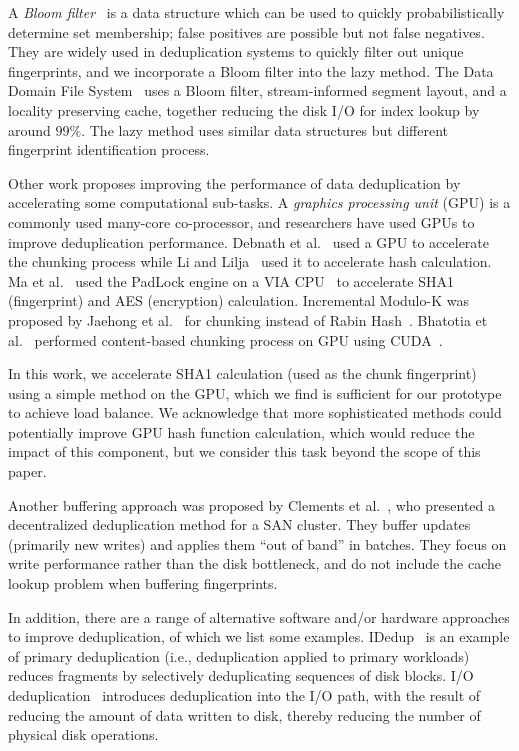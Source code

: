 \documentclass[prodmode,acmtecs]{acmsmall}
\begin{document}
A \emph{Bloom filter}~\cite{bloom1970space,bose2008false} is a data structure which can be used to quickly probabilistically determine set membership; false positives are possible but not false negatives.  They are widely used in deduplication systems to quickly filter out unique fingerprints, and we incorporate a Bloom filter into the lazy method.  The Data Domain File System~\cite{zhu2008avoiding} uses a Bloom filter, stream-informed segment layout, and a locality preserving cache, together reducing the disk I/O for index lookup by around $99\%$. The lazy method uses similar data structures but different fingerprint identification process.

Other work proposes improving the performance of data deduplication by accelerating some computational sub-tasks. A \emph{graphics processing unit} (GPU) is a commonly used many-core co-processor, and researchers have used GPUs to improve deduplication performance. Debnath et al.~\cite{bhatotia2012shredder} used a GPU to accelerate the chunking process while Li and Lilja~\cite{li2009highly} used it to accelerate hash calculation.  Ma et al.~\cite{ma2010towards} used the PadLock engine on a VIA CPU~\cite{via} to accelerate SHA1 (fingerprint) and AES (encryption) calculation.  Incremental Modulo-K was proposed by Jaehong et al.~\cite{min2011efficient} for chunking instead of Rabin Hash~\cite{rabin1981fingerprinting}.  Bhatotia et al.~\cite{bhatotia2012shredder} performed content-based chunking process on GPU using CUDA~\cite{cuda}.

In this work, we accelerate SHA1 calculation (used as the chunk fingerprint) using a simple method on the GPU, which we find is sufficient for our prototype to achieve load balance.  We acknowledge that more sophisticated methods could potentially improve GPU hash function calculation, which would reduce the impact of this component, but we consider this task beyond the scope of this paper.

Another buffering approach was proposed by Clements et al.~\cite{clements2009decentralized}, who presented a decentralized deduplication method for a SAN cluster.  They buffer updates (primarily new writes) and applies them ``out of band'' in batches. They focus on write performance rather than the disk bottleneck, and do not include the cache lookup problem when buffering fingerprints.

In addition, there are a range of alternative software and/or hardware approaches to improve deduplication, of which we list some examples.  IDedup~\cite{srinivasan2012idedup} is an example of primary deduplication (i.e., deduplication applied to primary workloads) reduces fragments by selectively deduplicating sequences of disk blocks. I/O deduplication~\cite{koller2010i/o} introduces deduplication into the I/O path, with the result of reducing the amount of data written to disk, thereby reducing the number of physical disk operations.
\end{document}
